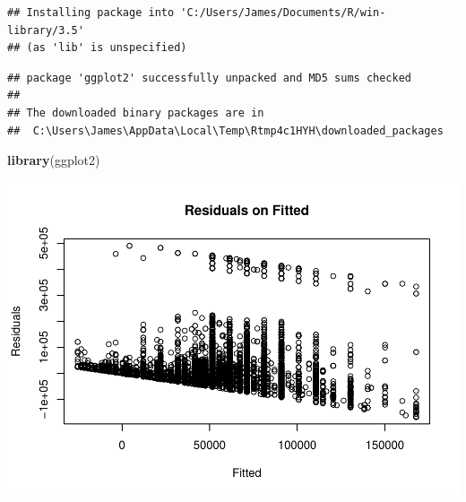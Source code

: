 \documentclass[]{article}
\newenvironment{Shaded}{\begin{snugshade}}{\end{snugshade}}
\newcommand{\KeywordTok}[1]{\textcolor[rgb]{0.13,0.29,0.53}{\textbf{#1}}}
\newcommand{\DataTypeTok}[1]{\textcolor[rgb]{0.13,0.29,0.53}{#1}}
\newcommand{\StringTok}[1]{\textcolor[rgb]{0.31,0.60,0.02}{#1}}
\newcommand{\OperatorTok}[1]{\textcolor[rgb]{0.81,0.36,0.00}{\textbf{#1}}}
\newcommand{\NormalTok}[1]{#1}
\begin{document}
\begin{verbatim}
## Installing package into 'C:/Users/James/Documents/R/win-library/3.5'
## (as 'lib' is unspecified)
\end{verbatim}

\begin{verbatim}
## package 'ggplot2' successfully unpacked and MD5 sums checked
## 
## The downloaded binary packages are in
##  C:\Users\James\AppData\Local\Temp\Rtmp4c1HYH\downloaded_packages
\end{verbatim}

\begin{Shaded}
\begin{Highlighting}[]
\KeywordTok{library}\NormalTok{(ggplot2)}
\end{Highlighting}
\end{Shaded}

\includegraphics{HW0_Final_files/figure-latex/unnamed-chunk-1-1.pdf}

\begin{Shaded}
\end{Shaded}
\end{document}
